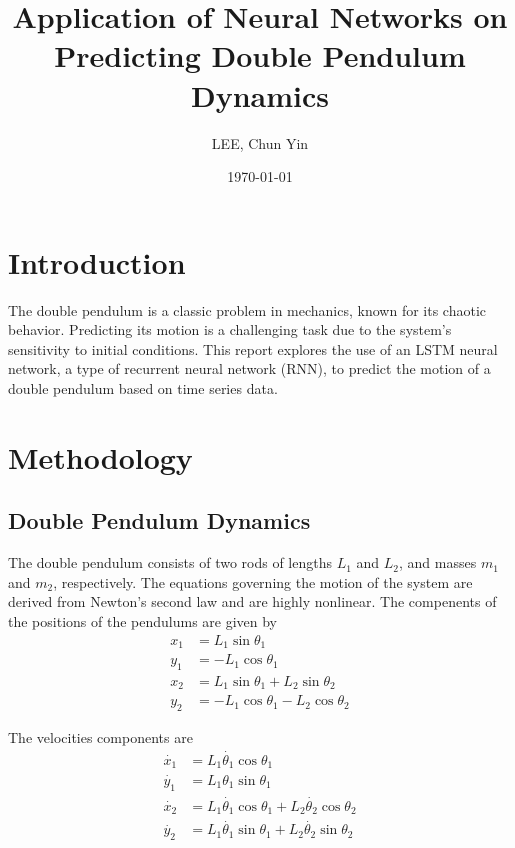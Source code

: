 \documentclass[12pt]{article}
\title{Application of Neural Networks on Predicting Double Pendulum Dynamics}
\author{LEE, Chun Yin}
\date{\today}
\begin{document}
\maketitle

\newpage




\section{Introduction}
The double pendulum is a classic problem in mechanics, known for its chaotic behavior. Predicting its motion is a challenging task due to the system's sensitivity to initial conditions\cite{levien1993double}. This report explores the use of an LSTM neural network, a type of recurrent neural network (RNN), to predict the motion of a double pendulum based on time series data.

\section{Methodology}
\subsection{Double Pendulum Dynamics}
The double pendulum consists of two rods of lengths $L_1$ and $L_2$, and masses $m_1$ and $m_2$, respectively. The equations governing the motion of the system are derived from Newton's second law and are highly nonlinear.
The compenents of the positions of the pendulums are given by \begin{align*}
    x_1 &= L_1 \sin \theta_1 \\
    y_1 &= -L_1 \cos \theta_1 \\
    x_2 &= L_1 \sin \theta_1 + L_2 \sin \theta_2 \\
    y_2 &= -L_1 \cos \theta_1 -L_2 \cos \theta_2 
\end{align*} 

\noindent The velocities components are \begin{align*}
    \dot{x_1} &= L_1 \dot{\theta_1} \cos \theta_1 \\
    \dot{y_1} &= L_1 \theta_1 \sin \theta_1 \\
    \dot{x_2} &= L_1 \dot{\theta_1} \cos \theta_1 + L_2 \dot{\theta_2} \cos \theta_2 \\
    \dot{y_2} &= L_1 \dot{\theta_1} \sin \theta_1 + L_2 \dot{\theta_2} \sin \theta_2
\end{align*}
\end{document}
